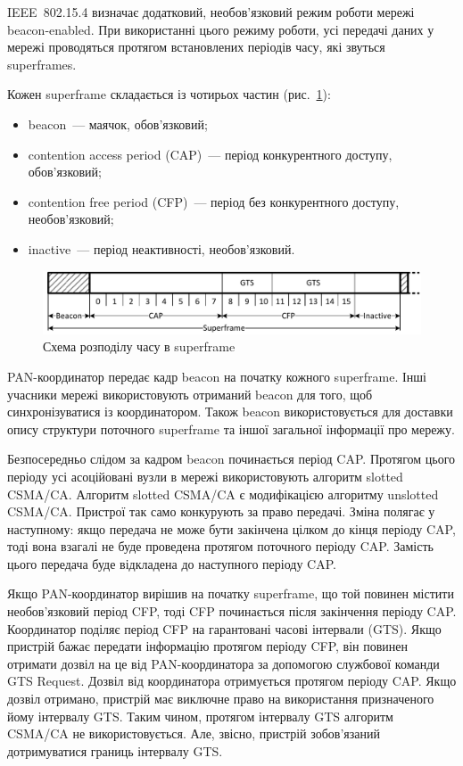 \documentclass[a4paper,ukrainian,utf8,nocolumnsxix,nocolumnxxxii,nocolumnxxxi,floatsection,equationsection]{eskdtext}
\newcommand{\figref}[1]{рис.~\ref{#1}}
\newcommand{\iee}[0]{IEEE~802.15.4\xspace}
\newcommand{\csma}[0]{CSMA/CA\xspace}
\newcommand{\ucsma}[0]{unslotted \csma\xspace}
\newcommand{\scsma}[0]{slotted \csma\xspace}
\newcommand{\bem}[0]{beacon-enabled\xspace}
\begin{document}
\iee визначає додатковий, необов'язковий режим роботи мережі \bem. При використанні цього режиму роботи, усі передачі даних у мережі проводяться протягом встановлених періодів часу, які звуться superframes. 

Кожен superframe складається із чотирьох частин (\figref{fig:superframe}):

\begin{itemize}
	\item beacon~--- маячок, обов'язковий;
	\item contention access period (CAP)~--- період конкурентного доступу, обов'язковий;
	\item contention free period (CFP)~--- період без конкурентного доступу, необов'язковий;
	\item inactive~--- період неактивності, необов'язковий.
\end{itemize}

\begin{figure}[htbp]
	\centering
	\includegraphics[width=\textwidth]{img/superframe.pdf}
	\caption{\label{fig:superframe}Схема розподілу часу в superframe}
\end{figure}

PAN-координатор передає кадр beacon на початку кожного superframe. Інші учасники мережі використовують отриманий beacon для того, щоб синхронізуватися із координатором. Також beacon використовується для доставки опису структури поточного superframe та іншої загальної інформації про мережу. 

Безпосередньо слідом за кадром beacon починається період CAP. Протягом цього періоду усі асоційовані вузли в мережі використовують алгоритм \scsma. Алгоритм \scsma є модифікацією алгоритму \ucsma. Пристрої так само конкурують за право передачі. Зміна полягає у наступному: якщо передача не може бути закінчена цілком до кінця періоду CAP, тоді вона взагалі не буде проведена протягом поточного періоду CAP. Замість цього передача буде відкладена до наступного періоду CAP. 

Якщо PAN-координатор вирішив на початку superframe, що той повинен містити необов'язковий період CFP, тоді CFP починається після закінчення періоду CAP. Координатор поділяє період CFP на гарантовані часові інтервали (GTS). Якщо пристрій бажає передати інформацію протягом періоду CFP, він повинен отримати дозвіл на це від PAN-координатора за допомогою службової команди GTS Request. Дозвіл від координатора отримується протягом періоду CAP. Якщо дозвіл отримано, пристрій має виключне право на використання призначеного йому інтервалу GTS. Таким чином, протягом інтервалу GTS алгоритм \csma не використовується. Але, звісно, пристрій зобов'язаний дотримуватися границь інтервалу GTS. 
\end{document}
